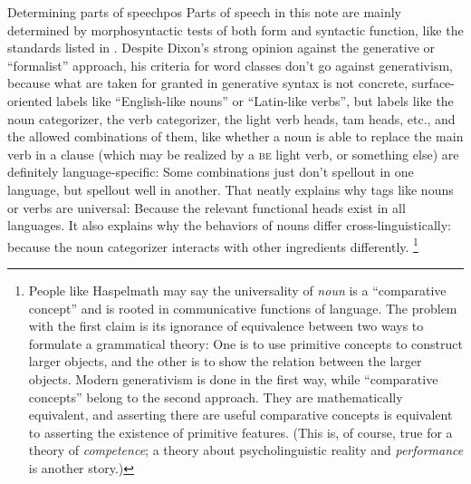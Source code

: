 \documentclass[UTF8, a4paper, oneside, scheme=plain]{ctexrep}
\newcommand*{\citesec}[1]{\S~{#1}}
\newcommand*{\term}[1]{\emph{#1}}
\newcommand{\category}[1]{\textsc{#1}}
\begin{document}
\begin{theorybox}{Determining parts of speech}{pos}
    Parts of speech in this note are mainly determined 
    by morphosyntactic tests of both form and syntactic function,
    like the standards listed in \citet[\citesec{3.3}]{dixon2009basic1}.
    Despite Dixon's strong opinion against the generative or ``formalist'' approach,
    his criteria for word classes don't go against generativism,
    because what are taken for granted in generative syntax 
    is not concrete, surface-oriented labels like ``English-like nouns'' or ``Latin-like verbs'', 
    but labels like the noun categorizer, the verb categorizer,
    the light verb heads, \acs{tam} heads, etc.,
    and the allowed combinations of them, 
    like whether a noun is able to replace the main verb in a clause 
    (which may be realized by a \category{be} light verb, or something else)
    are definitely language-specific:
    Some combinations just don't spellout in one language,
    but spellout well in another.
    That neatly explains why tags like nouns or verbs are universal:
    Because the relevant functional heads exist in all languages.
    It also explains why the behaviors of nouns differ cross-linguistically:
    because the noun categorizer interacts with other ingredients differently.%
    \footnote{
        People like Haspelmath may say the universality of \term{noun} 
        is a ``comparative concept'' and is rooted in communicative functions of language.
        The problem with the first claim is its ignorance of equivalence between 
        two ways to formulate a grammatical theory:
        One is to use primitive concepts to construct larger objects,
        and the other is to show the relation between the larger objects.
        Modern generativism is done in the first way,
        while ``comparative concepts'' belong to the second approach.
        They are mathematically equivalent,
        and asserting there are useful comparative concepts 
        is equivalent to asserting the existence of primitive features.
        (This is, of course, true for a theory of \emph{competence};
        a theory about psycholinguistic reality and \emph{performance} is another story.)

}
\end{theorybox}
\end{document}
